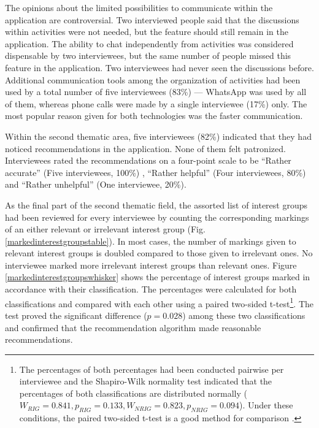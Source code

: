 \documentclass[12pt,numbers=noenddot,parskip,bibliography=totocnumbered,listof=totocnumbered,draft]{scrreprt}
\begin{document}
The opinions about the limited possibilities to communicate within the application are controversial. Two interviewed people said that the discussions within activities were not needed, but the feature should still remain in the application. The ability to chat independently from activities was considered dispensable by two interviewees, but the same number of people missed this feature in the application. Two interviewees had never seen the discussions before. Additional communication tools among the organization of activities had been used by a total number of five interviewees (83\%) — \mbox{WhatsApp} \citep{whatsapp} was used by all of them, whereas phone calls were made by a single interviewee (17\%) only. The most popular reason given for both technologies was the faster communication.

Within the second thematic area, five interviewees (82\%) indicated that they had noticed recommendations in the application. None of them felt patronized. Interviewees rated the recommendations on a four-point scale to be ``Rather accurate'' (Five interviewees, 100\%) , ``Rather helpful'' (Four interviewees, 80\%) and ``Rather unhelpful'' (One interviewee, 20\%).

As the final part of the second thematic field, the assorted list of interest groups had been reviewed for every interviewee by counting the corresponding markings of an either relevant or irrelevant interest group (Fig. \ref{markedinterestgroupstable}). In most cases, the number of markings given to relevant interest groups is doubled compared to those given to irrelevant ones. No interviewee marked more irrelevant interest groups than relevant ones. Figure \ref{markedinterestgroupswhisker} shows the percentage of interest groups marked in accordance with their classification. The percentages were calculated for both classifications and compared with each other using a paired two-sided t-test\footnote{The percentages of both percentages had been conducted pairwise per interviewee and the Shapiro-Wilk normality test \citep[p.466]{hedderich2015} indicated that the percentages of both classifications are distributed normally ($W_{RIG}=0.841, p_{RIG}=0.133, W_{NRIG}=0.823, p_{NRIG}=0.094$). Under these conditions, the paired two-sided t-test is a good method for comparison \citep[p.523]{hedderich2015}.}. The test proved the significant difference ($p=0.028$) among these two classifications and confirmed that the recommendation algorithm made reasonable recommendations.
\end{document}
